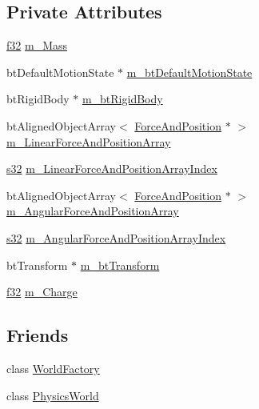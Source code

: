 \subsection*{Private Attributes}
\begin{DoxyCompactItemize}
\item 
\mbox{\hyperlink{_util_8h_a5f6906312a689f27d70e9d086649d3fd}{f32}} \mbox{\hyperlink{classnjli_1_1_physics_body_rigid_ac62838462af7ad59f3763646a3062496}{m\+\_\+\+Mass}}
\item 
bt\+Default\+Motion\+State $\ast$ \mbox{\hyperlink{classnjli_1_1_physics_body_rigid_afd22b7559363849aaa342867380a6eb3}{m\+\_\+bt\+Default\+Motion\+State}}
\item 
bt\+Rigid\+Body $\ast$ \mbox{\hyperlink{classnjli_1_1_physics_body_rigid_ad0c3d067b9532e7670182595df270d42}{m\+\_\+bt\+Rigid\+Body}}
\item 
bt\+Aligned\+Object\+Array$<$ \mbox{\hyperlink{classnjli_1_1_physics_body_rigid_1_1_force_and_position}{Force\+And\+Position}} $\ast$ $>$ \mbox{\hyperlink{classnjli_1_1_physics_body_rigid_a9af7b03d6c6ef5aa06807ac323ad9007}{m\+\_\+\+Linear\+Force\+And\+Position\+Array}}
\item 
\mbox{\hyperlink{_util_8h_aa62c75d314a0d1f37f79c4b73b2292e2}{s32}} \mbox{\hyperlink{classnjli_1_1_physics_body_rigid_ab2c6509114dbd98b54082105ed189c12}{m\+\_\+\+Linear\+Force\+And\+Position\+Array\+Index}}
\item 
bt\+Aligned\+Object\+Array$<$ \mbox{\hyperlink{classnjli_1_1_physics_body_rigid_1_1_force_and_position}{Force\+And\+Position}} $\ast$ $>$ \mbox{\hyperlink{classnjli_1_1_physics_body_rigid_a08b68126e5e77a81c7b4da2d618ecfe5}{m\+\_\+\+Angular\+Force\+And\+Position\+Array}}
\item 
\mbox{\hyperlink{_util_8h_aa62c75d314a0d1f37f79c4b73b2292e2}{s32}} \mbox{\hyperlink{classnjli_1_1_physics_body_rigid_aaefaed500ce6efd686be0bd8eee056f6}{m\+\_\+\+Angular\+Force\+And\+Position\+Array\+Index}}
\item 
bt\+Transform $\ast$ \mbox{\hyperlink{classnjli_1_1_physics_body_rigid_ac3048306f34e8a0be2551b99303216d4}{m\+\_\+bt\+Transform}}
\item 
\mbox{\hyperlink{_util_8h_a5f6906312a689f27d70e9d086649d3fd}{f32}} \mbox{\hyperlink{classnjli_1_1_physics_body_rigid_a1bbc2a7a02bedcc65adb61e37d742eda}{m\+\_\+\+Charge}}
\end{DoxyCompactItemize}
\subsection*{Friends}
\begin{DoxyCompactItemize}
\item 
class \mbox{\hyperlink{classnjli_1_1_physics_body_rigid_acb96ebb09abe8f2a37a915a842babfac}{World\+Factory}}
\item 
class \mbox{\hyperlink{classnjli_1_1_physics_body_rigid_abd7959b8cbcd7c25bc6c0c8b1ea26ce6}{Physics\+World}}
\end{DoxyCompactItemize}


